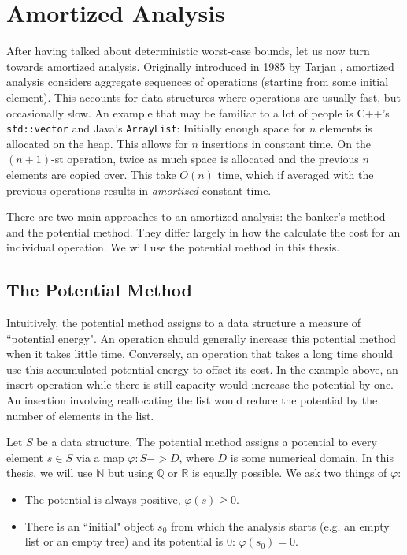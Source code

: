 
\chapter{Amortized Analysis}
After having talked about deterministic worst-case bounds, let us now turn towards amortized analysis. Originally introduced in 1985 by Tarjan \cite{tarjan:1985:amortizedcc}, amortized analysis considers aggregate sequences of operations (starting from some initial element). This accounts for data structures where operations are usually fast, but occasionally slow. An example that may be familiar to a lot of people is C++'s \texttt{std::vector} and Java's \texttt{ArrayList}: Initially enough space for $n$ elements is allocated on the heap. This allows for $n$ insertions in constant time. On the $(n+1)$-st operation, twice as much space is allocated and the previous $n$ elements are copied over. This take $O(n)$ time, which if averaged with the previous operations results in \emph{amortized} constant time.

There are two main approaches to an amortized analysis: the banker's method and the potential method. They differ largely in how the calculate the cost for an individual operation. We will use the potential method in this thesis.

\section{The Potential Method}
Intuitively, the potential method assigns to a data structure a measure of ``potential energy". An operation should generally increase this potential method when it takes little time. Conversely, an operation that takes a long time should use this accumulated potential energy to offset its cost. In the example above, an insert operation while there is still capacity would increase the potential by one. An insertion involving reallocating the list would reduce the potential by the number of elements in the list.

Let $S$ be a data structure. The potential method assigns a potential to every element $s \in S$ via a map $\varphi : S -> D$, where $D$ is some numerical domain. In this thesis, we will use $\mathbb N$ but using $\mathbb Q$ or $\mathbb R$ is equally possible. We ask two things of $\varphi$:

\begin{itemize}
    \item The potential is always positive, $\varphi(s) \geq 0$.
    \item There is an ``initial" object $s_0$ from which the analysis starts (e.g. an empty list or an empty tree) and its potential is 0: $\varphi(s_0) = 0$.
\end{itemize}

